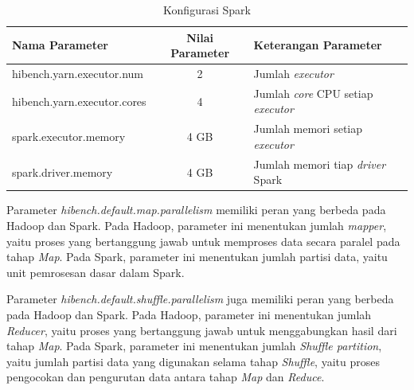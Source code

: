 \begin{table}[h]
\caption{Konfigurasi Spark}
\label{table:conf-spark}
\scriptsize
\centering
\begin{tabular}{l c p{5cm}} 
\hline
\textbf{Nama Parameter} & \textbf{Nilai Parameter} & \textbf{Keterangan Parameter} \\ \hline
hibench.yarn.executor.num & 2 & Jumlah \textit{executor} \\
hibench.yarn.executor.cores & 4 & Jumlah \textit{core} CPU setiap \textit{executor}\\ 
spark.executor.memory & 4 GB & Jumlah memori setiap \textit{executor} \\
spark.driver.memory & 4 GB & Jumlah memori tiap \textit{driver} Spark\\ \hline                        
\end{tabular}
\end{table}

Parameter \textit{hibench.default.map.parallelism} memiliki peran yang berbeda pada Hadoop dan Spark. Pada Hadoop, parameter ini menentukan jumlah \textit{mapper}, yaitu proses yang bertanggung jawab untuk memproses data secara paralel pada tahap \textit{Map}. Pada Spark, parameter ini menentukan jumlah partisi data, yaitu unit pemrosesan dasar dalam Spark.

Parameter \textit{hibench.default.shuffle.parallelism} juga memiliki peran yang berbeda pada Hadoop dan Spark. Pada Hadoop, parameter ini menentukan jumlah \textit{Reducer}, yaitu proses yang bertanggung jawab untuk menggabungkan hasil dari tahap \textit{Map}. Pada Spark, parameter ini menentukan jumlah \textit{Shuffle partition}, yaitu jumlah partisi data yang digunakan selama tahap \textit{Shuffle}, yaitu proses pengocokan dan pengurutan data antara tahap \textit{Map} dan \textit{Reduce}.


